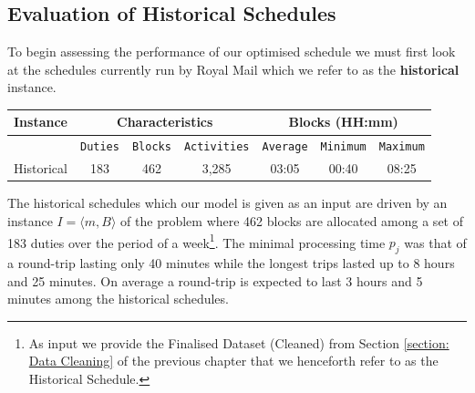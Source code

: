 	
	
\subsection*{Evaluation of Historical Schedules}
To begin assessing the performance of our optimised schedule we must first look at the schedules currently run by Royal Mail which we refer to as the \textbf{historical} instance.


\begin{table}[h]
\small
    \centering 
    \begin{tabular}{|c|c|c|c|c|c|c|}
        \hline
        \textbf{Instance} & \multicolumn{3}{|c|}{ \textbf{Characteristics}} & \multicolumn{3}{|c|}{ \textbf{Blocks (HH:mm)}}  \\
        \hline
        & \texttt{Duties} & \texttt{Blocks} & \texttt{Activities} & \texttt{Average} &  \texttt{Minimum} & \texttt{Maximum} \\
        \hline
        Historical & 183 & 462 & 3,285 & 03:05 & 00:40 & 08:25 \\
        \hline
    \end{tabular}%
    \medbreak
\end{table}


\vspace{\baselineskip}
\noindent
The historical schedules which our model is given as an input are driven by an instance $I = \langle{m},B\rangle{}$ of the problem where 462 blocks are allocated among a set of 183 duties over the period of a week\footnote{As input we provide the Finalised Dataset (Cleaned) from Section \ref{section: Data Cleaning} of the previous chapter that we henceforth refer to as the Historical Schedule.}. The minimal processing time $p_{j}$ was that of a round-trip lasting only 40 minutes while the longest trips lasted up to 8 hours and 25 minutes. On average a round-trip is expected to last 3 hours and 5 minutes among the historical schedules. 



